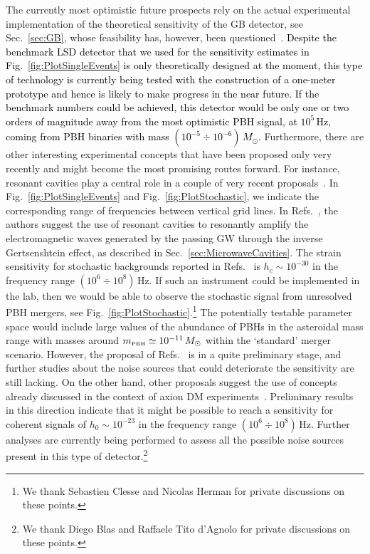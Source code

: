 \documentclass[11pt,a4paper]{article}
\begin{document}
The currently most optimistic future prospects rely on the actual experimental implementation of the theoretical sensitivity of the GB detector, see Sec.~\ref{sec:GB}, whose feasibility has, however, been questioned~\cite{Woods:2012upj}. \textcolor{black}{Despite the benchmark LSD detector that we used for the sensitivity estimates in Fig.~\ref{fig:PlotSingleEvents} is only theoretically designed at the moment, this type of technology is currently being tested with the construction of a one-meter prototype and hence is likely to make progress in the near future. If the benchmark numbers could be achieved, this detector would be only one or two orders of magnitude away from the most optimistic PBH signal, at $10^5 \, \text{Hz}$, coming from PBH binaries with mass $(10^{-5} \div 10^{-6}) \, M_\odot$.} Furthermore, there are other interesting experimental concepts that have been proposed only very recently and might become the most promising routes forward. For instance, resonant cavities play a central role in a couple of very recent proposals~\cite{Herman:2020wao, Herman:2022fau, Berlin:2021txa, Berlin:2022hfx}. In Fig.~\ref{fig:PlotSingleEvents} and Fig.~\ref{fig:PlotStochastic}, we indicate the corresponding range of frequencies between vertical grid lines.
In Refs.~\cite{Herman:2020wao, Herman:2022fau}, the authors suggest the use of resonant cavities to resonantly amplify the electromagnetic waves generated by the passing GW through the inverse Gertsenshtein effect, as described in Sec.~\ref{sec:MicrowaveCavities}. The strain sensitivity for stochastic backgrounds reported in Refs.~\cite{Herman:2020wao, Herman:2022fau} is $h_c \sim 10^{-30}$ in the frequency range $(10^6\div10^8) \, \text{Hz}$. If such an instrument could be implemented in the lab, then we would be able to observe the stochastic signal from unresolved PBH mergers, see Fig.~\ref{fig:PlotStochastic}.\footnote{We thank Sebastien Clesse and Nicolas Herman for private discussions on these points.}
The potentially testable parameter space would include large values of the abundance of PBHs in the asteroidal mass range with masses around $m_\text{\tiny{PBH}}\simeq 10^{-11} \, M_\odot$ within the ‘standard’ merger scenario.
However, the proposal of Refs.~\cite{Herman:2020wao, Herman:2022fau} is in a quite preliminary stage, and further studies about the noise sources that could deteriorate the sensitivity are still lacking. On the other hand, other proposals suggest the use of concepts already discussed in the context of axion DM experiments~\cite{Berlin:2019ahk, Berlin:2020vrk}. Preliminary results in this direction indicate that it might be possible to reach a sensitivity for coherent signals of $h_0 \sim 10^{-23}$ in the frequency range $(10^6\div 10^8) \, \text{Hz}$. Further analyses are currently being performed to assess all the possible noise sources present in this type of detector.\footnote{We thank Diego Blas and Raffaele Tito d'Agnolo for private discussions on these points.}
\end{document}
